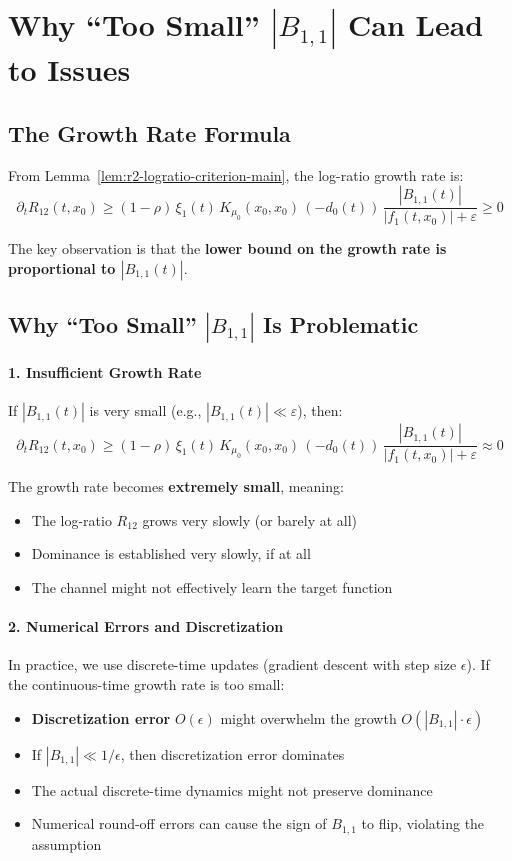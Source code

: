 \section{Why ``Too Small'' $|B_{1,1}|$ Can Lead to Issues}
\label{sec:why-B1-small-issue}

\subsection{The Growth Rate Formula}

From Lemma~\ref{lem:r2-logratio-criterion-main}, the log-ratio growth rate is:
\[
\partial_t R_{12}(t,x_0) \ge (1-\rho)\,\xi_1(t)\,K_{\mu_0}(x_0,x_0)\,(-d_0(t))\,\frac{|B_{1,1}(t)|}{|f_1(t,x_0)|+\varepsilon} \ge 0
\]

The key observation is that the \textbf{lower bound on the growth rate is proportional to $|B_{1,1}(t)|$}.

\subsection{Why ``Too Small'' $|B_{1,1}|$ Is Problematic}

\paragraph*{1. Insufficient Growth Rate}

If $|B_{1,1}(t)|$ is very small (e.g., $|B_{1,1}(t)| \ll \varepsilon$), then:
\[
\partial_t R_{12}(t,x_0) \ge (1-\rho)\,\xi_1(t)\,K_{\mu_0}(x_0,x_0)\,(-d_0(t))\,\frac{|B_{1,1}(t)|}{|f_1(t,x_0)|+\varepsilon} \approx 0
\]

The growth rate becomes \textbf{extremely small}, meaning:
\begin{itemize}
\item The log-ratio $R_{12}$ grows very slowly (or barely at all)
\item Dominance is established very slowly, if at all
\item The channel might not effectively learn the target function
\end{itemize}

\paragraph*{2. Numerical Errors and Discretization}

In practice, we use discrete-time updates (gradient descent with step size $\epsilon$). If the continuous-time growth rate is too small:
\begin{itemize}
\item \textbf{Discretization error} $O(\epsilon)$ might overwhelm the growth $O(|B_{1,1}| \cdot \epsilon)$
\item If $|B_{1,1}| \ll 1/\epsilon$, then discretization error dominates
\item The actual discrete-time dynamics might not preserve dominance
\item Numerical round-off errors can cause the sign of $B_{1,1}$ to flip, violating the assumption
\end{itemize}

